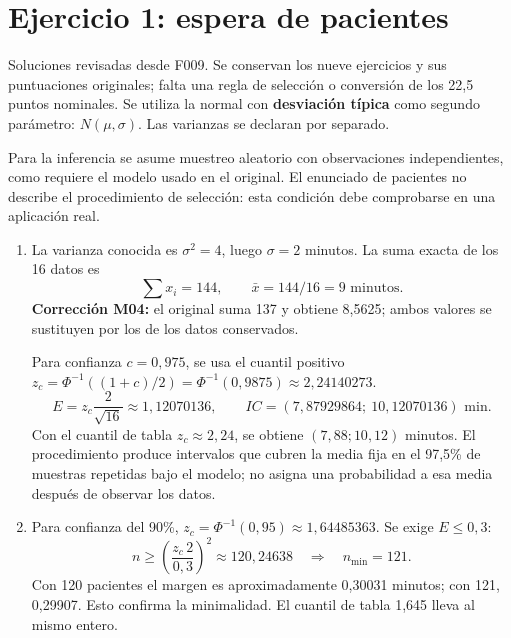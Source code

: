 \documentclass[11pt]{article}
\begin{document}
\section*{Ejercicio 1: espera de pacientes}
Soluciones revisadas desde F009. Se conservan los nueve ejercicios y sus puntuaciones originales; falta una regla de selección o conversión de los 22,5 puntos nominales. Se utiliza la normal con \textbf{desviación típica} como segundo parámetro: $N(\mu,\sigma)$. Las varianzas se declaran por separado.

Para la inferencia se asume muestreo aleatorio con observaciones independientes, como requiere el modelo usado en el original. El enunciado de pacientes no describe el procedimiento de selección: esta condición debe comprobarse en una aplicación real.
\begin{enumerate}[label=(\alph*)]
\item La varianza conocida es $\sigma^2=4$, luego $\sigma=2$ minutos. La suma exacta de los 16 datos es
\[
\sum x_i=144,\qquad \bar x=144/16=\boxed{9\text{ minutos}}.
\]
\textbf{Corrección M04:} el original suma 137 y obtiene 8,5625; ambos valores se sustituyen por los de los datos conservados.

Para confianza $c=0,975$, se usa el cuantil positivo $z_c=\Phi^{-1}((1+c)/2)=\Phi^{-1}(0,9875)\approx2,24140273$.
\[
E=z_c\frac{2}{\sqrt{16}}\approx1,12070136,\qquad
IC=\boxed{(7,87929864;\ 10,12070136)}\text{ min}.
\]
Con el cuantil de tabla $z_c\approx2,24$, se obtiene $(7,88;10,12)$ minutos. El procedimiento produce intervalos que cubren la media fija en el 97,5\% de muestras repetidas bajo el modelo; no asigna una probabilidad a esa media después de observar los datos.
\item Para confianza del 90\%, $z_c=\Phi^{-1}(0,95)\approx1,64485363$. Se exige $E\leq0,3$:
\[
n\geq\left(\frac{z_c\,2}{0,3}\right)^2\approx120,24638
\quad\Longrightarrow\quad\boxed{n_{\min}=121}.
\]
Con 120 pacientes el margen es aproximadamente 0,30031 minutos; con 121, 0,29907. Esto confirma la minimalidad. El cuantil de tabla 1,645 lleva al mismo entero.
\end{enumerate}
\clearpage
\end{document}

